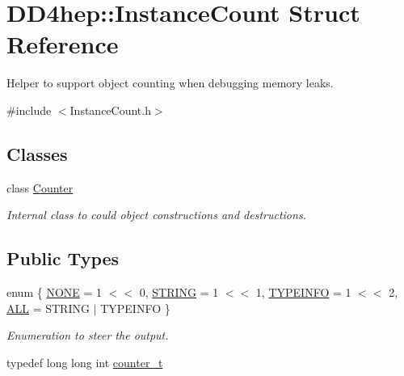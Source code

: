 \hypertarget{struct_d_d4hep_1_1_instance_count}{
\section{DD4hep::InstanceCount Struct Reference}
\label{struct_d_d4hep_1_1_instance_count}
}


Helper to support object counting when debugging memory leaks.  


{\ttfamily \#include $<$InstanceCount.h$>$}\subsection*{Classes}
\begin{DoxyCompactItemize}
\item 
class \hyperlink{class_d_d4hep_1_1_instance_count_1_1_counter}{Counter}
\begin{DoxyCompactList}\small\item\em Internal class to could object constructions and destructions. \item\end{DoxyCompactList}\end{DoxyCompactItemize}
\subsection*{Public Types}
\begin{DoxyCompactItemize}
\item 
enum \{ \hyperlink{struct_d_d4hep_1_1_instance_count_ae1ac289e30ac5ae83640ae2ed97f947ca7ef09dfc0136f6756ab56b221b86115a}{NONE} =  1 $<$$<$ 0, 
\hyperlink{struct_d_d4hep_1_1_instance_count_ae1ac289e30ac5ae83640ae2ed97f947ca62f53809ed03b36e645549bc7da959d3}{STRING} =  1 $<$$<$ 1, 
\hyperlink{struct_d_d4hep_1_1_instance_count_ae1ac289e30ac5ae83640ae2ed97f947ca87ab47dcf03aaa78096e84a187544373}{TYPEINFO} =  1 $<$$<$ 2, 
\hyperlink{struct_d_d4hep_1_1_instance_count_ae1ac289e30ac5ae83640ae2ed97f947ca948324c1e49c9a310b45c9f681b381a8}{ALL} =  STRING $|$ TYPEINFO
 \}
\begin{DoxyCompactList}\small\item\em Enumeration to steer the output. \item\end{DoxyCompactList}\item 
typedef long long int \hyperlink{struct_d_d4hep_1_1_instance_count_ae81dc0c76b135425e14b6dc38262a727}{counter\_\-t}
\end{DoxyCompactItemize}
